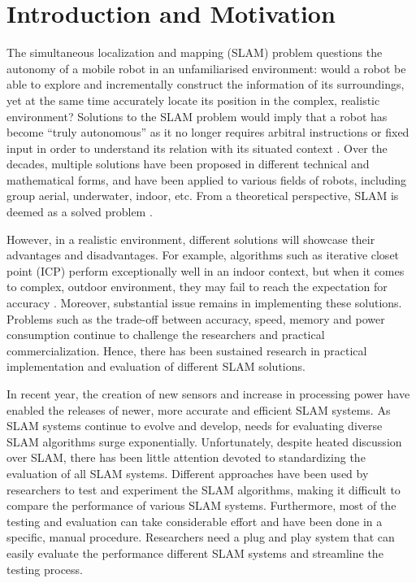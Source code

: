 
\chapter{Introduction and Motivation} %

\label{chapter1} %

The simultaneous localization and mapping (SLAM) problem questions the autonomy of a mobile robot in an unfamiliarised environment: would a robot be able to explore and incrementally construct the information of its surroundings, yet at the same time accurately locate its position in the complex, realistic environment?
Solutions to the SLAM problem would imply that a robot has become “truly autonomous” as it no longer requires arbitral instructions or fixed input in order to understand its relation with its situated context \cite{durrant2006simultaneous}.
Over the decades, multiple solutions have been proposed in different technical and mathematical forms, and have been applied to various fields of robots, including group aerial, underwater, indoor, etc. 
From a theoretical perspective, SLAM is deemed as a solved problem \cite{durrant2006simultaneous}. 

However, in a realistic environment, different solutions will showcase their advantages and disadvantages. 
For example, algorithms such as iterative closet point (ICP) perform exceptionally well in an indoor context, but when it comes to complex, outdoor environment, they may fail to reach the expectation for accuracy \cite{krinkin2018evaluation}. 
Moreover, substantial issue remains in implementing these solutions. 
Problems such as the trade-off between accuracy, speed, memory and power consumption continue to challenge the researchers and practical commercialization. 
Hence, there has been sustained research in practical implementation and evaluation of different SLAM solutions. 

In recent year, the creation of new sensors and increase in processing power have enabled the releases of newer, more accurate and efficient SLAM systems. 
As SLAM systems continue to evolve and develop, needs for evaluating diverse SLAM algorithms surge exponentially. 
Unfortunately, despite heated discussion over SLAM, there has been little attention devoted to standardizing the evaluation of all SLAM systems. 
Different approaches have been used by researchers to test and experiment the SLAM algorithms, making it difficult to compare the performance of various SLAM systems. 
Furthermore, most of the testing and evaluation can take considerable effort and have been done in a specific, manual procedure. 
Researchers need a plug and play system that can easily evaluate the performance different SLAM systems and streamline the testing process. 

